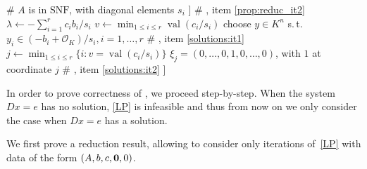 \documentclass[sigconf]{acmart}
\DeclareMathOperator{\val}{val}
\newcommand{\OK}{\mathcal{O}_K}
\begin{document}
\begin{algorithm}[!ht]
\begin{algorithmic}[1]
      \hfill {\color{olive} \# $A$ is in $\mathrm{SNF}$, with diagonal elements $s_{i}$} \label{step:core:begin}
      \IF{$\bigwedge_{i=r+1}^d (\val(b_{i}) \geq 0)$} \label{step:condition}
      \RETURN [UNBOUND, []] \hfill {\color{olive} \# , item \ref{prop:reduc_it2}} \label{step:unbound}
      \ELSE %
      \STATE $\lambda \leftarrow -\sum_{i=1}^r c_i b_i / s_{i}$
      \STATE $v \leftarrow \min_{1 \leq i \leq r} \val (c_i/s_{i})$
      \IF{$\val \lambda < v$}
      \STATE choose $y \in K^n$ s.\,t. $y_i \in (-b_i+\OK)/s_{i}, i=1,\ldots,r$
      \RETURN [FEAS, $y$] \hfill {\color{olive} \# , item \ref{solutions:it1}}
      \ELSE
      \STATE $j \leftarrow \min_{1 \leq i \leq r} \{i : v = \val (c_i/s_{i})\}$
      \STATE $\xi_j = (0,\ldots,0,1,0,\ldots,0)$, with $1$ at coordinate $j$
      \RETURN [FEAS, $\xi_j$] \hfill {\color{olive} \# , item \ref{solutions:it2}}
      \ENDIF
      \ENDIF 
      \ENDIF 
      \RETURN [INFEAS, []] \label{step:core:end}
    \end{algorithmic}
\end{algorithm}

In order to prove correctness of , we proceed step-by-step.
When the system $Dx=e$ has no solution, \eqref{LP} is infeasible and
thus from now on we only consider the case when $Dx=e$ has a solution.

We first prove a reduction result, allowing to consider only iterations
of~\eqref{LP} with data of the form $(A,b,c,{\bf 0},0)$.
\end{document}
